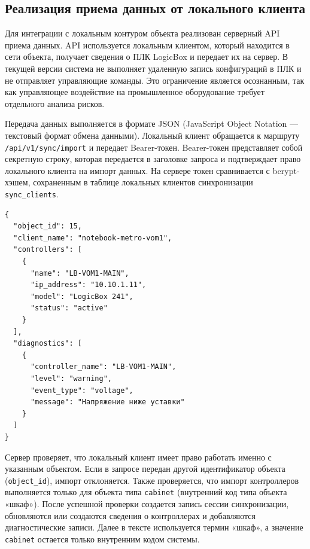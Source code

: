 \subsection{Реализация приема данных от локального клиента}

Для интеграции с локальным контуром объекта реализован серверный API приема данных. API используется локальным клиентом, который находится в сети объекта, получает сведения о ПЛК LogicBox и передает их на сервер. В текущей версии система не выполняет удаленную запись конфигураций в ПЛК и не отправляет управляющие команды. Это ограничение является осознанным, так как управляющее воздействие на промышленное оборудование требует отдельного анализа рисков.

Передача данных выполняется в формате JSON (JavaScript Object Notation --- текстовый формат обмена данными). Локальный клиент обращается к маршруту \texttt{/api/v1/sync/}\allowbreak\texttt{import} и передает Bearer-токен. Bearer-токен представляет собой секретную строку, которая передается в заголовке запроса и подтверждает право локального клиента на импорт данных. На сервере токен сравнивается с bcrypt-хэшем, сохраненным в таблице локальных клиентов синхронизации \texttt{sync\_clients}.

\begin{samepage}
\begin{lstlisting}[caption={Общая структура запроса синхронизации}, label={lst:chapter3_sync_json}]
{
  "object_id": 15,
  "client_name": "notebook-metro-vom1",
  "controllers": [
    {
      "name": "LB-VOM1-MAIN",
      "ip_address": "10.10.1.11",
      "model": "LogicBox 241",
      "status": "active"
    }
  ],
  "diagnostics": [
    {
      "controller_name": "LB-VOM1-MAIN",
      "level": "warning",
      "event_type": "voltage",
      "message": "Напряжение ниже уставки"
    }
  ]
}
\end{lstlisting}
\end{samepage}

Сервер проверяет, что локальный клиент имеет право работать именно с указанным объектом. Если в запросе передан другой идентификатор объекта (\texttt{object\_id}), импорт отклоняется. Также проверяется, что импорт контроллеров выполняется только для объекта типа \texttt{cabinet} (внутренний код типа объекта «шкаф»). После успешной проверки создается запись сессии синхронизации, обновляются или создаются сведения о контроллерах и добавляются диагностические записи. Далее в тексте используется термин «шкаф», а значение \texttt{cabinet} остается только внутренним кодом системы.

